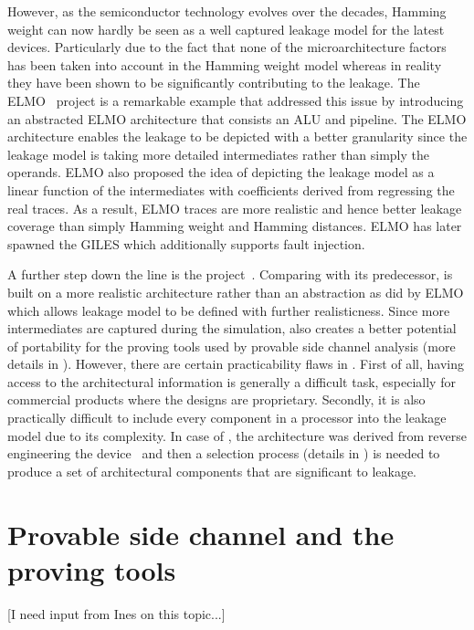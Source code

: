 \documentclass[]{report}
\begin{document}
However, as the semiconductor technology evolves over the decades, Hamming weight can now hardly be seen as a well captured leakage model for the latest devices. Particularly due to the fact that none of the microarchitecture factors has been taken into account in the Hamming weight model whereas in reality they have been shown to be significantly contributing to the leakage. The ELMO~\cite{ELMO} project is a remarkable example that addressed this issue by introducing an abstracted ELMO architecture that consists an ALU and pipeline. The ELMO architecture enables the leakage to be depicted with a better granularity since the leakage model is taking more detailed intermediates rather than simply the operands. ELMO also proposed the idea of depicting the leakage model as a linear function of the intermediates with coefficients derived from regressing the real traces. As a result, ELMO traces are more realistic and hence better leakage coverage than simply Hamming weight and Hamming distances. ELMO has later spawned the GILES\cite{GILES} which additionally supports fault injection.

A further step down the line is the \uelmo project~\cite{SiModel,SiReverse}. Comparing with its predecessor, \uelmo is built on a more realistic architecture rather than an abstraction as did by ELMO which allows leakage model to be defined with further realisticness. Since more intermediates are captured during the simulation, \uelmo also creates a better potential of portability for the proving tools used by provable side channel analysis (more details in ). However, there are certain practicability flaws in \uelmo. First of all, having access to the architectural information is generally a difficult task, especially for commercial products where the designs are proprietary. Secondly, it is also practically difficult to include every component in a processor into the leakage model due to its complexity. In case of \uelmo, the architecture was derived from reverse engineering the device~\cite{SiReverse} and then a selection process (details in \cite{SiModel}) is needed to produce a set of architectural components that are significant to leakage. 


\section{Provable side channel and the proving tools\label{sec:ProvableSCA}}
[I need input from Ines on this topic...]
\end{document}

